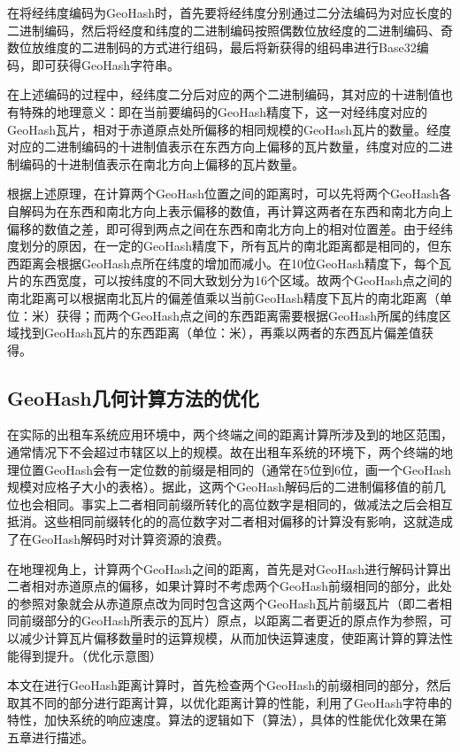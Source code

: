 在将经纬度编码为GeoHash时，首先要将经纬度分别通过二分法编码为对应长度的二进制编码，然后将经度和纬度的二进制编码按照偶数位放经度的二进制编码、奇数位放维度的二进制码的方式进行组码，最后将新获得的组码串进行Base32编码，即可获得GeoHash字符串。

在上述编码的过程中，经纬度二分后对应的两个二进制编码，其对应的十进制值也有特殊的地理意义：即在当前要编码的GeoHash精度下，这一对经纬度对应的GeoHash瓦片，相对于赤道原点处所偏移的相同规模的GeoHash瓦片的数量。经度对应的二进制编码的十进制值表示在东西方向上偏移的瓦片数量，纬度对应的二进制编码的十进制值表示在南北方向上偏移的瓦片数量。

根据上述原理，在计算两个GeoHash位置之间的距离时，可以先将两个GeoHash各自解码为在东西和南北方向上表示偏移的数值，再计算这两者在东西和南北方向上偏移的数值之差，即可得到两点之间在东西和南北方向上的相对位置差。由于经纬度划分的原因，在一定的GeoHash精度下，所有瓦片的南北距离都是相同的，但东西距离会根据GeoHash点所在纬度的增加而减小。在10位GeoHash精度下，每个瓦片的东西宽度，可以按纬度的不同大致划分为16个区域。故两个GeoHash点之间的南北距离可以根据南北瓦片的偏差值乘以当前GeoHash精度下瓦片的南北距离（单位：米）获得；而两个GeoHash点之间的东西距离需要根据GeoHash所属的纬度区域找到GeoHash瓦片的东西距离（单位：米），再乘以两者的东西瓦片偏差值获得。

\subsection{GeoHash几何计算方法的优化}
在实际的出租车系统应用环境中，两个终端之间的距离计算所涉及到的地区范围，通常情况下不会超过市辖区以上的规模。故在出租车系统的环境下，两个终端的地理位置GeoHash会有一定位数的前缀是相同的（通常在5位到6位，画一个GeoHash规模对应格子大小的表格）。据此，这两个GeoHash解码后的二进制偏移值的前几位也会相同。事实上二者相同前缀所转化的高位数字是相同的，做减法之后会相互抵消。这些相同前缀转化的的高位数字对二者相对偏移的计算没有影响，这就造成了在GeoHash解码时对计算资源的浪费。

在地理视角上，计算两个GeoHash之间的距离，首先是对GeoHash进行解码计算出二者相对赤道原点的偏移，如果计算时不考虑两个GeoHash前缀相同的部分，此处的参照对象就会从赤道原点改为同时包含这两个GeoHash瓦片前缀瓦片（即二者相同前缀部分的GeoHash所表示的瓦片）原点，以距离二者更近的原点作为参照，可以减少计算瓦片偏移数量时的运算规模，从而加快运算速度，使距离计算的算法性能得到提升。（优化示意图）

本文在进行GeoHash距离计算时，首先检查两个GeoHash的前缀相同的部分，然后取其不同的部分进行距离计算，以优化距离计算的性能，利用了GeoHash字符串的特性，加快系统的响应速度。算法的逻辑如下（算法），具体的性能优化效果在第五章进行描述。



